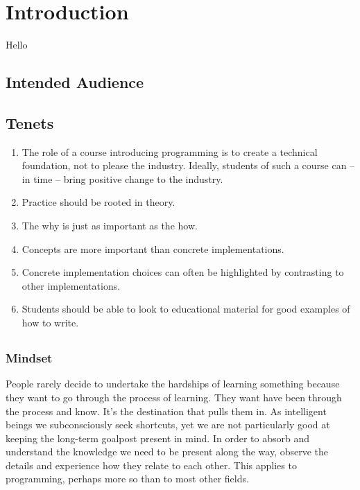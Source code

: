 \chapter{Introduction}
\label{sec:intro}

Hello

\section{Intended Audience}

\section{Tenets}

\begin{enumerate}
  \item The role of a course introducing programming is to create a technical foundation, not to please the industry. Ideally, students of such a course can -- in time -- bring positive change to the industry.
  \item Practice should be rooted in theory.
  \item The why is just as important as the how.
  \item Concepts are more important than concrete implementations.
  \item Concrete implementation choices can often be highlighted by contrasting to other implementations.
  \item Students should be able to look to educational material for good examples of how to write.
\end{enumerate}

\section{}

\subsection{Mindset}

\begin{inspiration}{\cite{selfrel}}
\end{inspiration}

People rarely decide to undertake the hardships of learning something because they want to go through the process of learning. They want have been through the process and know. It's the destination that pulls them in. As intelligent beings we subconsciously seek shortcuts, yet we are not particularly good at keeping the long-term goalpost present in mind. In order to absorb and understand the knowledge we need to be present along the way, observe the details and experience how they relate to each other. This applies to programming, perhaps more so than to most other fields.

